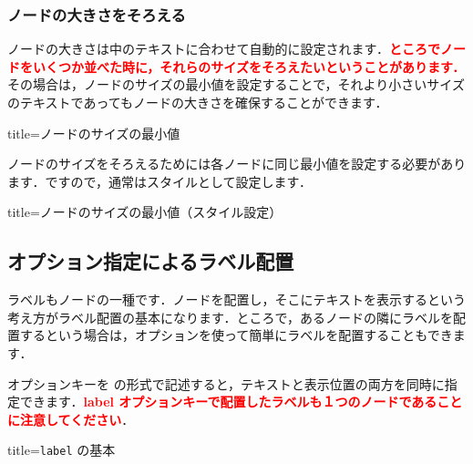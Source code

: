 \documentclass[../geometrymemo.tex]{subfiles}
\begin{document}
\subsubsection{ノードの大きさをそろえる}

ノードの大きさは中のテキストに合わせて自動的に設定されます．\textcolor{red}{\textbf{ところでノードをいくつか並べた時に，それらのサイズをそろえたいということがあります．}}その場合は，ノードのサイズの最小値を設定することで，それより小さいサイズのテキストであってもノードの大きさを確保することができます．
\begin{tcblisting}{title=ノードのサイズの最小値}
\end{tcblisting}

ノードのサイズをそろえるためには各ノードに同じ最小値を設定する必要があります．ですので，通常はスタイルとして設定します．
\begin{tcblisting}{title=ノードのサイズの最小値（スタイル設定）}
\end{tcblisting}

\subsection{オプション指定によるラベル配置}

ラベルもノードの一種です．ノードを配置し，そこにテキストを表示するという考え方がラベル配置の基本になります．ところで，あるノードの隣にラベルを配置するという場合は，オプションを使って簡単にラベルを配置することもできます．

 オプションキーを  の形式で記述すると，テキストと表示位置の両方を同時に指定できます．\textcolor{red}{\textbf{label オプションキーで配置したラベルも１つのノードであることに注意してください}}．
\begin{tcblisting}{title=\texttt{label} の基本}
\end{tcblisting}
\end{document}

